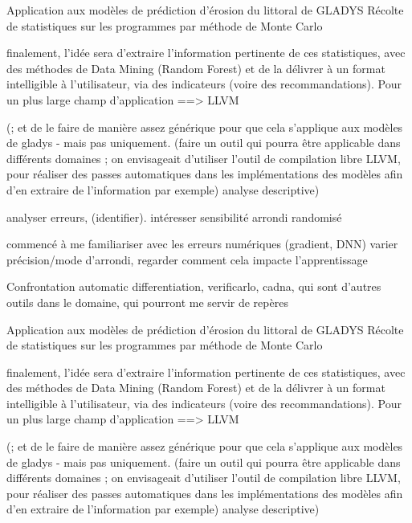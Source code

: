 \documentclass[a4paper,11pt]{article}
\begin{document}
Application aux modèles de prédiction d’érosion du littoral de GLADYS
Récolte de statistiques sur les programmes par méthode de Monte Carlo

finalement, l’idée sera d’extraire l’information pertinente de ces statistiques, avec des méthodes de Data Mining (Random Forest)
et de la délivrer à un format intelligible à l’utilisateur, via des indicateurs (voire des recommandations).
Pour un plus large champ d’application  ==> LLVM

 (; et de le faire de manière assez générique pour que cela s’applique aux modèles de gladys - mais pas uniquement.
(faire un outil qui pourra être applicable dans différents domaines ; on envisageait d’utiliser l’outil de compilation libre LLVM, pour réaliser des passes automatiques dans les implémentations des modèles afin d’en extraire de l’information par exemple)
analyse descriptive)


analyser erreurs, (identifier).
intéresser sensibilité arrondi randomisé

commencé à me familiariser avec les erreurs numériques (gradient, DNN)
varier précision/mode d’arrondi, regarder comment cela impacte l’apprentissage

Confrontation
automatic differentiation, verificarlo, cadna, qui sont d’autres outils dans le domaine, qui pourront me servir de repères

Application aux modèles de prédiction d’érosion du littoral de GLADYS
Récolte de statistiques sur les programmes par méthode de Monte Carlo

finalement, l’idée sera d’extraire l’information pertinente de ces statistiques, avec des méthodes de Data Mining (Random Forest)
et de la délivrer à un format intelligible à l’utilisateur, via des indicateurs (voire des recommandations).
Pour un plus large champ d’application ==> LLVM

 (; et de le faire de manière assez générique pour que cela s’applique aux modèles de gladys - mais pas uniquement.
(faire un outil qui pourra être applicable dans différents domaines ; on envisageait d’utiliser l’outil de compilation libre LLVM, pour réaliser des passes automatiques dans les implémentations des modèles afin d’en extraire de l’information par exemple)
analyse descriptive)
\end{document}
